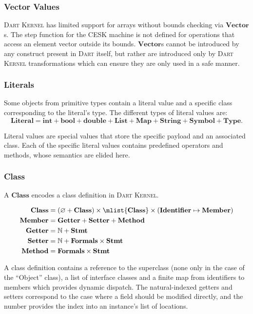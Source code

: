 \documentclass[a4paper,oneside,fleqn]{article}
\newcommand{\kernel}{\textsc{Dart Kernel}}
\newcommand{\dart}{\textsc{Dart}}
\renewcommand{\emptyset}{\varnothing}
\newcommand{\NN}{\mathbb{N}}    %
\newcommand{\dstmt}{\mathbf{Stmt}}
\newcommand{\dlit}{\mathbf{Literal}}
\newcommand{\dvector}{\mathbf{Vector}}
\newcommand{\dmember}{\mathbf{Member}}
\newcommand{\dident}{\mathbf{Identifier}}
\newcommand{\dtype}{\mathbf{Type}}
\newcommand{\dclass}{\mathbf{Class}}
\newcommand{\dformals}{\mathbf{Formals}}
\newcommand{\dsemint}{\mathbf{int}}
\newcommand{\dsembool}{\mathbf{bool}}
\newcommand{\dsemdouble}{\mathbf{double}}
\newcommand{\dsemlist}{\mathbf{List}}
\newcommand{\dsemmap}{\mathbf{Map}}
\newcommand{\dsemstring}{\mathbf{String}}
\newcommand{\dsemsymbol}{\mathbf{Symbol}}
\begin{document}
\subsubsection{Vector Values}
\label{subsubsec:vector-values}

\kernel{} has limited support for arrays without bounds checking via $\dvector$s.
The step function for the CESK machine is not defined for operations that access an element vector outside its bounds.
$\dvector$s cannot be introduced by any construct present in \dart{} itself, but rather are introduced only by \kernel{} transformations which can ensure they are only used in a safe manner.

\subsubsection{Literals}

Some objects from primitive types contain a literal value and a specific class corresponding to the literal's type.
The different types of literal values are:
\[\dlit = \dsemint + \dsembool + \dsemdouble + \dsemlist + \dsemmap + \dsemstring + \dsemsymbol + \dtype.\]

Literal values are special values that store the specific payload and an associated class.
Each of the specific literal values contains predefined operators and methods, whose semantics are elided here.

\subsubsection{Class}
\label{subsubsec:class}

A $\dclass$ encodes a class definition in \kernel{}.

\begin{align*}
\dclass &= (\emptyset + \dclass) \times \mlist{\dclass} \times (\dident \mapsto \dmember)\\
\dmember &= \mathbf{Getter} + \mathbf{Setter} + \mathbf{Method} \\
\mathbf{Getter} &= \NN + \dstmt \\
\mathbf{Setter} &= \NN + \dformals \times \dstmt \\
\mathbf{Method} &= \dformals \times \dstmt
\end{align*}

A class definition contains a reference to the superclass (none only in the case of the ``Object'' class), a list of interface classes and a finite map from identifiers to members which provides dynamic dispatch.
The natural-indexed getters and setters correspond to the case where a field should be modified directly, and the number provides the index into an instance's list of locations.
\end{document}
